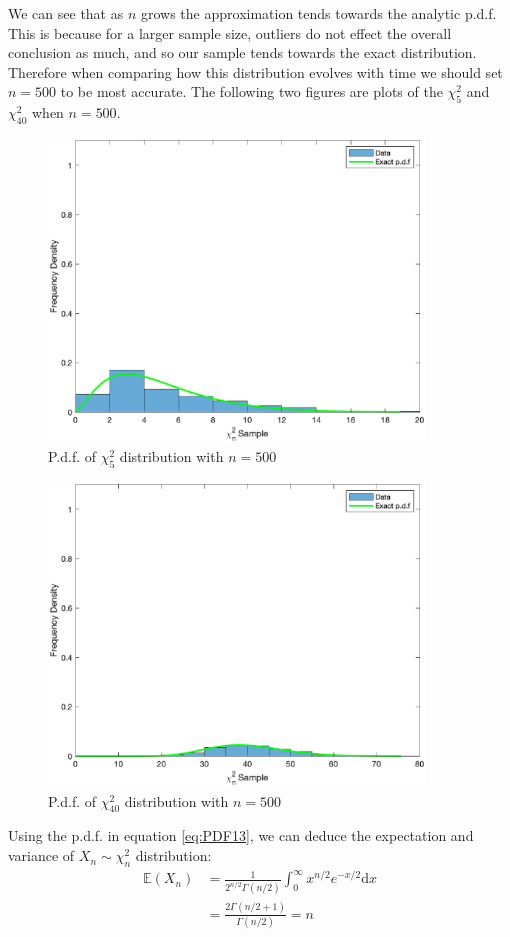 \documentclass[10pt,a4paper,notitlepage]{article}
\newcommand{\E}[1]{\mathbb{E}\left(#1\right)}
\begin{document}
We can see that as $n$ grows the approximation tends towards the analytic p.d.f.  This is because for a larger sample size, outliers do not effect the overall conclusion as much, and so our sample tends towards the exact distribution. Therefore when comparing how this distribution evolves with time we should set $n=500$ to be most accurate.  The following two figures are plots of the $\chi_{5}^{2}$ and $\chi_{40}^{2}$ when $n=500$.
\begin{figure}[H]
\centering
\includegraphics[width=10cm]{Image_13_2}
\caption{P.d.f. of $\chi_{5}^{2}$ distribution with $n=500$}
\end{figure}
\begin{figure}[H]
\centering
\includegraphics[width=10cm]{Image_13_3}
\caption{P.d.f. of $\chi_{40}^{2}$ distribution with $n=500$}
\end{figure}
Using the p.d.f. in equation \eqref{eq:PDF13}, we can deduce the expectation and variance of $X_{n}\sim \chi_{n}^{2}$ distribution:
\begin{equation}\label{eq:Q13E}
\begin{aligned}
\E{X_{n}} &=\frac{1}{2^{n/2}\Gamma\left(n/2\right)}\int_{0}^{\infty}x^{n/2}e^{-x/2}\mathrm{d}x\\
&=\frac{2\Gamma\left(n/2+1\right)}{\Gamma\left(n/2\right)}=n
\end{aligned}
\end{equation}
\end{document}
